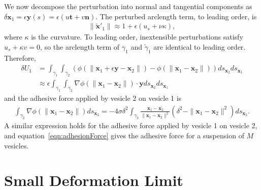 \documentclass[%
preprint,
 amsmath,amssymb,
 aps,
]{revtex4-1}
\newcommand{\nn}{\mathbf{n}}
\renewcommand{\tt}{\mathbf{t}}
\newcommand{\xx}{\mathbf{x}}
\newcommand{\yy}{\mathbf{y}}
\begin{document}
\begin{appendices}
We now decompose the perturbation into normal and tangential components
as $\delta \xx_1 = \epsilon \yy(s) = \epsilon(u\tt + v\nn)$. The
perturbed arclength term, to leading order, is
\begin{align*}
  \|\tilde{\xx}'_1\| \approx 1 + \epsilon(u_s + \nu\kappa),
\end{align*}
where $\kappa$ is the curvature.  To leading order, inextensible
perturbations satisfy $u_s + \kappa v = 0$, so the arclength term of
$\gamma_1$ and $\tilde{\gamma}_1$ are identical to leading order.
Therefore,
\begin{align*}
  \delta U_1 &= \int_{\gamma_1} \int_{\gamma_2} \left(
  \phi(\|\xx_1 + \epsilon \yy  - \xx_2\|) - \phi(\|\xx_1 - \xx_2\|)
  \right) ds_{\xx_2} ds_{\xx_1} \\
  &\approx \epsilon \int_{\gamma_1} \int_{\gamma_2}
  \nabla \phi (\|\xx_1 - \xx_2\|) \cdot \yy ds_{\xx_2} ds_{\xx_1}
\end{align*}
and the adhesive force applied by vesicle 2 on vesicle 1 is
\begin{align*}
  \int_{\gamma_2}\nabla \phi(\|\xx_1 - \xx_2\|)ds_{\xx_2} = 
  -4 \sigma \delta^2 \int_{\gamma_2}
  \frac{\xx_1 - \xx_2}{\|\xx_1 - \xx_2\|^2} 
  \left(\delta^2 - \|\xx_1 - \xx_2\|^2 \right) ds_{\xx_2}.
\end{align*}
A similar expression holds for the adhesive force applied by vesicle 1
on vesicle 2, and equation~\eqref{eqn:adhesionForce} gives the adhesive
force for a suspension of $M$ vesicles.

\section{Small Deformation Limit}
\label{sec:appendixB}




\end{appendices}
\end{document}
